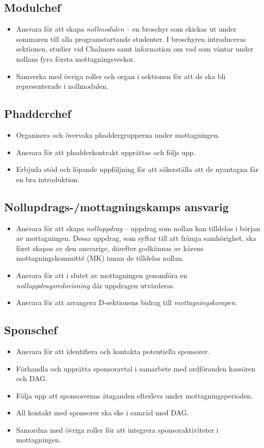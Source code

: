 \documentclass[a4paper]{dtekinstruktion}
\begin{document}
\subsection{Modulchef}
\begin{itemize}
  \item Ansvara för att skapa \emph{nollmodulen} – en broschyr som skickas ut under sommaren till alla programstartande studenter. I broschyren introduceras sektionen, studier vid Chalmers samt information om vad som väntar under nollans fyra första mottagningsveckor.
  \item Samverka med övriga roller och organ i sektionen för att de ska bli representerade i nollmodulen.
\end{itemize}

\subsection{Phadderchef}
\begin{itemize}
  \item Organisera och övervaka phaddergrupperna under mottagningen.
  \item Ansvara för att phadderkontrakt upprättas och följs upp.
  \item Erbjuda stöd och löpande uppföljning för att säkerställa att de nyantagna får en bra introduktion.
\end{itemize}

\subsection{Nollupdrags-/mottagningskamps ansvarig}
\begin{itemize}
  \item Ansvara för att skapa \emph{nolluppdrag} – uppdrag som nollan kan tilldelas i början av mottagningen. Dessa uppdrag, som syftar till att främja samhörighet, ska först skapas av den ansvarige, därefter godkännas av kårens mottagningskommitté (MK) innan de tilldelas nollan.
  \item Ansvara för att i slutet av mottagningen genomföra en \emph{nolluppdragsredovisning} där uppdragen utvärderas.
  \item Ansvara för att arrangera D-sektionens bidrag till \emph{mottagningskampen}.
\end{itemize}

\subsection{Sponschef}
\begin{itemize}
  \item Ansvara för att identifiera och kontakta potentiella sponsorer.
  \item Förhandla och upprätta sponsoravtal i samarbete med ordföranden kassören och DAG.
  \item Följa upp att sponsorernas åtaganden efterlevs under mottagningsperioden.
  \item All kontakt med sponsorer ska ske i samråd med DAG.
  \item Samordna med övriga roller för att integrera sponsoraktiviteter i mottagningen.
\end{itemize}
\end{document}
